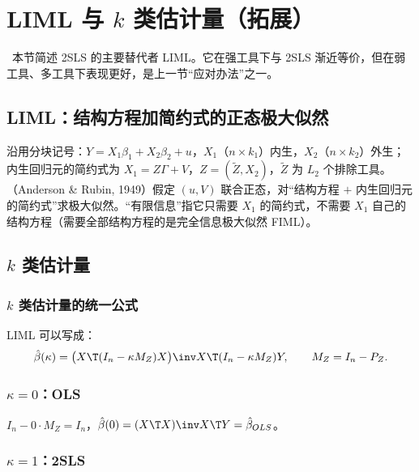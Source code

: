 \section{LIML 与 \texorpdfstring{$k$}{k} 类估计量（拓展）}\label{sec:U08b-liml}

\tagext\ 本节简述 2SLS 的主要替代者 LIML。它在强工具下与 2SLS 渐近等价，但在弱工具、多工具下表现更好，是上一节“应对办法”之一。

\subsection{LIML：结构方程加简约式的正态极大似然}

沿用分块记号：$Y=X_1\beta_1+X_2\beta_2+u$，$X_1$（$n\times k_1$）内生，$X_2$（$n\times k_2$）外生；内生回归元的简约式为 $X_1=Z\Gamma+V$，$Z=(\tilde Z,X_2)$，$\tilde Z$ 为 $L_2$ 个排除工具。（Anderson \& Rubin, 1949）假定 $(u,V)$ 联合正态，对“结构方程 $+$ 内生回归元的简约式”求极大似然。“有限信息”指它只需要 $X_1$ 的简约式，不需要 $X_1$ 自己的结构方程（需要全部结构方程的是完全信息极大似然 FIML）。

\subsection{\texorpdfstring{$k$}{k} 类估计量}

\subsubsection{\texorpdfstring{$k$}{k} 类估计量的统一公式}

LIML 可以写成：
\begin{equation}\label{eq:U08b-kclass}
\hat\beta(\kappa)=\big(X\T(I_n-\kappa M_Z)X\big)\inv X\T(I_n-\kappa M_Z)Y,\qquad M_Z=I_n-P_Z .
\end{equation}

\subsubsection{\texorpdfstring{$\kappa=0$}{kappa = 0}：OLS}

$I_n-0\cdot M_Z=I_n$，$\hat\beta(0)=(X\T X)\inv X\T Y=\hat\beta_{OLS}$。

\subsubsection{\texorpdfstring{$\kappa=1$}{kappa = 1}：2SLS}

